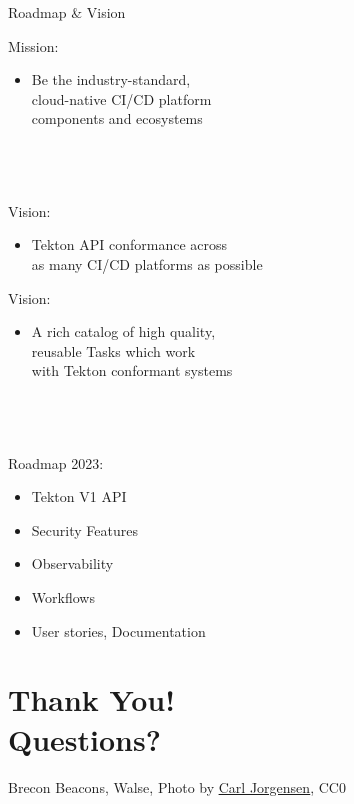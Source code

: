 \documentclass[aspectratio=169,11pt,hyperref={colorlinks=true}]{beamer}
\begin{document}
\begin{2columnsframe}{Roadmap \& Vision}%
  {%
  Mission:
  \begin{itemize}
    \item Be the industry-standard,\\
          cloud-native CI/CD platform \\
          components and ecosystems \\
  \end{itemize}
  ~\\
  ~\\
  \tiny~\\
  \normalsize
  Vision:
  \begin{itemize}
    \item Tekton API conformance across\\
          as many CI/CD platforms as possible
  \end{itemize}
  }{%
  Vision:
  \begin{itemize}
    \item A rich catalog of high quality,\\
          reusable Tasks which work\\
          with Tekton conformant systems\\
  \end{itemize}
  ~\\
  ~\\
  \tiny~\\
  \normalsize
  Roadmap 2023:
  \begin{itemize}
    \item Tekton V1 API
    \item Security Features
    \item Observability
    \item Workflows
    \item User stories, Documentation
  \end{itemize}
  }
\end{2columnsframe}

\section[Q\&A]{Thank You! \\Questions?}

\begin{sectionwithpiclargecentral}{Brecon Beacons, Walse, Photo by \href{https://unsplash.com/@scamartist}{\underline{Carl Jorgensen}}, CC0}
\end{sectionwithpiclargecentral}
\end{document}

